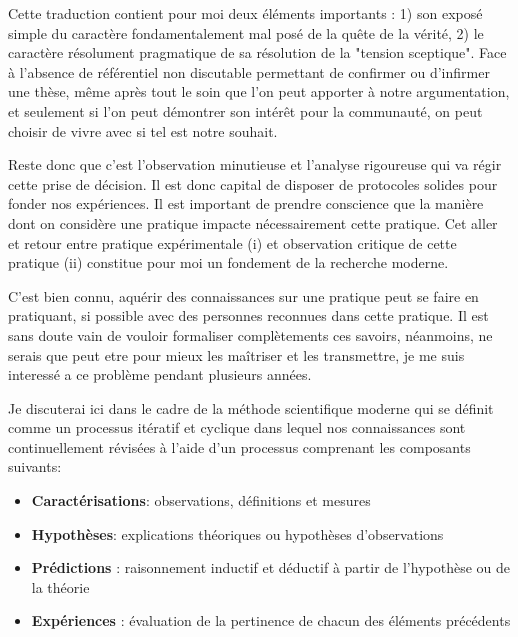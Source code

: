Cette traduction contient pour moi deux éléments importants : 1) son exposé simple du caractère fondamentalement mal posé de la quête de la vérité, 2) le caractère résolument pragmatique de sa résolution de la "tension sceptique". Face à l'absence de référentiel non discutable permettant de confirmer ou d'infirmer une thèse, même après tout le soin que l'on peut apporter à notre argumentation, et seulement si l'on peut démontrer son intérêt pour la communauté, on peut choisir de vivre avec si tel est notre souhait.

Reste donc que c'est l'observation minutieuse et l'analyse rigoureuse qui va régir cette prise de décision. Il est donc capital de disposer de protocoles solides pour fonder nos expériences. Il est important de prendre conscience que la manière dont on considère une pratique impacte nécessairement cette pratique. Cet aller et retour entre pratique expérimentale (i) et observation critique de cette pratique (ii) constitue pour moi un fondement de la recherche moderne.

C'est bien connu, aquérir des connaissances sur une pratique peut se faire en pratiquant, si possible avec des personnes reconnues dans cette pratique. Il est sans doute vain de vouloir formaliser complètements ces savoirs, néanmoins, ne serais que peut etre pour mieux les maîtriser et les transmettre, je me suis interessé a ce problème pendant plusieurs années.

Je discuterai ici dans le cadre de la méthode scientifique moderne qui se définit comme un processus itératif et cyclique dans lequel nos connaissances sont continuellement révisées à l'aide d'un processus comprenant les composants suivants:
\begin{itemize}
  \item \textbf{Caractérisations}: observations, définitions et mesures
  \item \textbf{Hypothèses}: explications théoriques ou hypothèses d'observations
  \item \textbf{Prédictions} : raisonnement inductif et déductif à partir de l'hypothèse ou de la théorie
  \item \textbf{Expériences} : évaluation de la pertinence de chacun des éléments précédents
\end{itemize}

